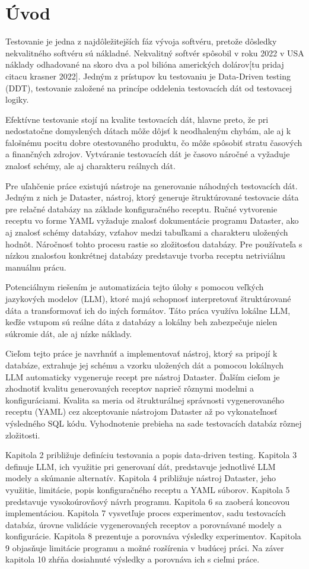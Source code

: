 \chapter{Úvod}
Testovanie je jedna z najdôležitejších fáz vývoja softvéru, pretože dôsledky nekvalitného softvéru sú nákladné. Nekvalitný softvér spôsobil v roku 2022 v USA náklady odhadované na skoro dva a pol bilióna amerických dolárov[tu pridaj citacu krasner 2022]. Jedným z prístupov ku testovaniu je Data-Driven testing (DDT), testovanie založené na princípe oddelenia testovacích dát od testovacej logiky.

Efektívne testovanie stojí na kvalite testovacích dát, hlavne preto, že pri nedostatočne domyslených dátach môže dôjsť k neodhaleným chybám, ale aj k falošnému pocitu dobre otestovaného produktu, čo môže spôsobiť stratu časových a finančných zdrojov.
Vytváranie testovacích dát je časovo náročné a vyžaduje znalosť schémy, ale aj charakteru reálnych dát.

Pre uľahčenie práce existujú nástroje na generovanie náhodných testovacích dát. Jedným z nich je Dataster, nástroj, ktorý generuje štruktúrované testovacie dáta pre relačné databázy na základe konfiguračného receptu. Ručné vytvorenie receptu vo forme YAML vyžaduje znalosť dokumentácie programu Dataster, ako aj znalosť schémy databázy, vzťahov medzi tabuľkami a charakteru uložených hodnôt. Náročnosť tohto procesu rastie so zložitosťou databázy. Pre používateľa s nízkou znalosťou konkrétnej databázy predstavuje tvorba receptu netriviálnu manuálnu prácu.

Potenciálnym riešením je automatizácia tejto úlohy s pomocou veľkých jazykových modelov (LLM), ktoré majú schopnosť interpretovať štruktúrované dáta a transformovať ich do iných formátov. Táto práca využíva lokálne LLM, keďže vstupom sú reálne dáta z databázy a lokálny beh zabezpečuje nielen súkromie dát, ale aj nízke náklady.

Cieľom tejto práce je navrhnúť a implementovať nástroj, ktorý sa pripojí k databáze, extrahuje jej schému a vzorku uložených dát a pomocou lokálnych LLM automaticky vygeneruje recept pre nástroj Dataster. Ďalším cieľom je zhodnotiť kvalitu generovaných receptov naprieč rôznymi modelmi a konfiguráciami. Kvalita sa meria od štrukturálnej správnosti vygenerovaného receptu (YAML) cez akceptovanie nástrojom Dataster až po vykonateľnosť výsledného SQL kódu. Vyhodnotenie prebieha na sade testovacích databáz rôznej zložitosti.

Kapitola 2 približuje definíciu testovania a popis data-driven testing. Kapitola 3 definuje LLM, ich využitie pri generovaní dát, predstavuje jednotlivé LLM modely a skúmanie alternatív. Kapitola 4 približuje nástroj Dataster, jeho využitie, limitácie, popis konfiguračného receptu a YAML súborov. Kapitola 5 predstavuje vysokoúrovňový návrh programu. Kapitola 6 sa zaoberá koncovou implementáciou. Kapitola 7 vysvetľuje proces experimentov, sadu testovacích databáz, úrovne validácie vygenerovaných receptov a porovnávané modely a konfigurácie. Kapitola 8 prezentuje a porovnáva výsledky experimentov. Kapitola 9 objasňuje limitácie programu a možné rozšírenia v budúcej práci. Na záver kapitola 10 zhŕňa dosiahnuté výsledky a porovnáva ich s cieľmi práce.




